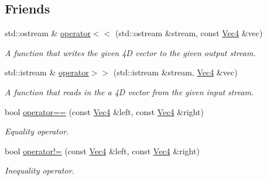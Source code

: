 \subsection*{Friends}
\begin{DoxyCompactItemize}
\item 
std\+::ostream \& \hyperlink{classgofxmath_1_1_vec4_a31c794bedecdf686aae40b9261ea38c5}{operator$<$$<$} (std\+::ostream \&stream, const \hyperlink{classgofxmath_1_1_vec4}{Vec4} \&vec)
\begin{DoxyCompactList}\small\item\em A function that writes the given 4\+D vector to the given output stream. \end{DoxyCompactList}\item 
std\+::istream \& \hyperlink{classgofxmath_1_1_vec4_ab5d34a5bf6bb543ab690436fc45c7319}{operator$>$$>$} (std\+::istream \&stream, \hyperlink{classgofxmath_1_1_vec4}{Vec4} \&vec)
\begin{DoxyCompactList}\small\item\em A function that reads in the a 4\+D vector from the given input stream. \end{DoxyCompactList}\item 
bool \hyperlink{classgofxmath_1_1_vec4_a75ec0a4eb1bdb2abb83280b62f2e94d3}{operator==} (const \hyperlink{classgofxmath_1_1_vec4}{Vec4} \&left, const \hyperlink{classgofxmath_1_1_vec4}{Vec4} \&right)
\begin{DoxyCompactList}\small\item\em Equality operator. \end{DoxyCompactList}\item 
bool \hyperlink{classgofxmath_1_1_vec4_a8ddc017b9087be64efa4fc76f1f63a12}{operator!=} (const \hyperlink{classgofxmath_1_1_vec4}{Vec4} \&left, const \hyperlink{classgofxmath_1_1_vec4}{Vec4} \&right)
\begin{DoxyCompactList}\small\item\em Inequality operator. \end{DoxyCompactList}\end{DoxyCompactItemize}
